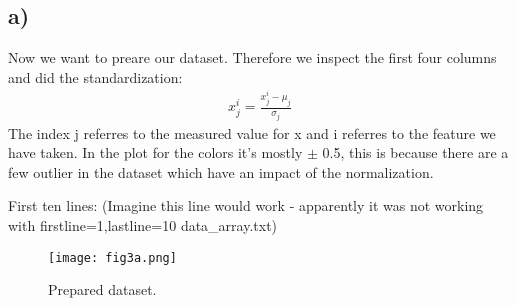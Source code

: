 \subsection{a)}
Now we want to preare our dataset. Therefore we inspect the first four columns and did the standardization:
\begin{align}
    x_j^{i} = \frac{x_j^{i} - \mu_j}{\sigma_j}
\end{align}
The index j referres to the measured value for x and i referres to the feature we have taken. In the plot for the colors it's mostly $\pm$ 0.5, this is because there are a few outlier in the dataset which have an impact of the normalization.

First ten lines:
%
(Imagine this line would work  - apparently it was not working with firstline=1,lastline=10 data_array.txt)

\begin{figure}[h!]
    \centering
    \texttt{[image: fig3a.png]}
    \caption{Prepared dataset.}
\end{figure}





